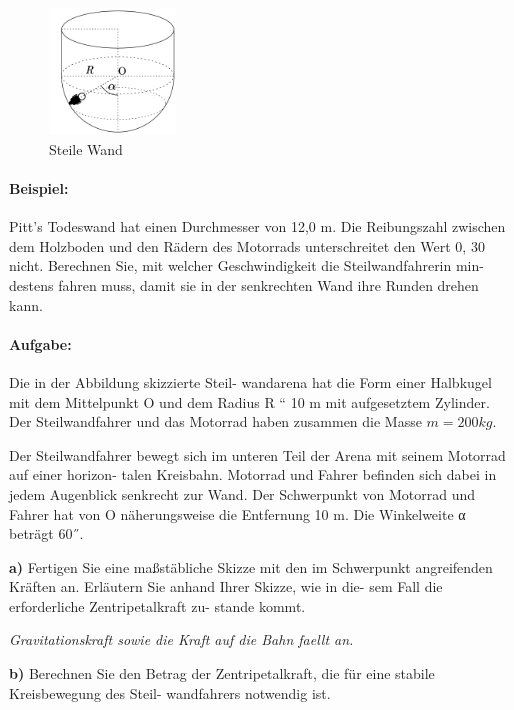 \documentclass{report}
\begin{document}
\begin{figure}[htpb]
  \begin{center}
    \includegraphics[width=0.3\textwidth]{./physic-figures/steil.png}
  \end{center}
  \caption{Steile Wand}
\end{figure}
\paragraph{Beispiel:}
Pitt’s Todeswand hat einen Durchmesser von 12,0 m. Die
Reibungszahl zwischen dem Holzboden und den Rädern des Motorrads
unterschreitet den Wert 0, 30 nicht.
Berechnen Sie, mit welcher Geschwindigkeit die Steilwandfahrerin min-
destens fahren muss, damit sie in der senkrechten Wand ihre Runden
drehen kann.

\paragraph{Aufgabe:}
Die in der Abbildung skizzierte Steil-
wandarena hat die Form einer Halbkugel mit
dem Mittelpunkt O und dem Radius R “ 10 m
mit aufgesetztem Zylinder. Der Steilwandfahrer
und das Motorrad haben zusammen die Masse
$m = 200 kg$.

Der Steilwandfahrer bewegt sich im unteren Teil
der Arena mit seinem Motorrad auf einer horizon-
talen Kreisbahn. Motorrad und Fahrer befinden
sich dabei in jedem Augenblick senkrecht zur Wand.
Der Schwerpunkt von Motorrad und Fahrer hat
von O näherungsweise die Entfernung 10 m. Die
Winkelweite α beträgt 60˝.

\textbf{a)} Fertigen Sie eine maßstäbliche Skizze mit den
im Schwerpunkt angreifenden Kräften an.
Erläutern Sie anhand Ihrer Skizze, wie in die-
sem Fall die erforderliche Zentripetalkraft zu-
stande kommt.

\textit{Gravitationskraft sowie die Kraft auf die Bahn faellt an.}


\textbf{b)} Berechnen Sie den Betrag der Zentripetalkraft,
die für eine stabile Kreisbewegung des Steil-
wandfahrers notwendig ist.
\end{document}
